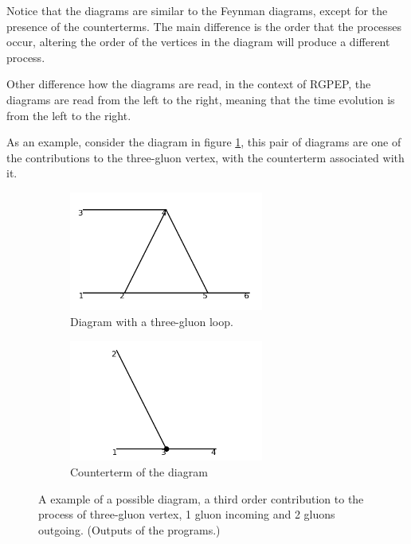 \documentclass[11pt,a4paper,twoside,pdf]{article}
\numberwithin{equation}{section}
\begin{document}
Notice that the diagrams are similar to the Feynman diagrams\cite{Peskin:1995ev}, except for the presence
of the counterterms. The main difference is the order that the processes occur, altering
the order of the vertices in the diagram will produce a different process. 

Other difference how the diagrams are read, in the context of RGPEP, the diagrams are
read from the left to the right, meaning that the time evolution is from the left to 
the right.

As an example, consider the diagram in figure \ref{fig:example_diagram}, this pair of 
diagrams are one of the contributions to the three-gluon vertex, with the counterterm 
associated with it. 

\begin{figure}[h!]
    \centering
    \begin{subfigure}[t]{0.5\textwidth}
        \centering
        \includegraphics[width=0.7\textwidth]{plots/order3/order3_1to2/1.png}
        \caption{Diagram with a three-gluon loop.}
    \end{subfigure}%
    \begin{subfigure}[t]{0.5\textwidth}
        \centering
        \includegraphics[width=0.7\textwidth]{plots/order3/order3_1to2/counterterms/1.png}
        \caption{Counterterm of the diagram}
    \end{subfigure}
    \caption{A example of a possible diagram, a third order contribution to the 
    process of three-gluon vertex, 1 gluon incoming and 2 gluons outgoing. (Outputs of 
    the programs.)}
    \label{fig:example_diagram}
\end{figure}
\end{document}
